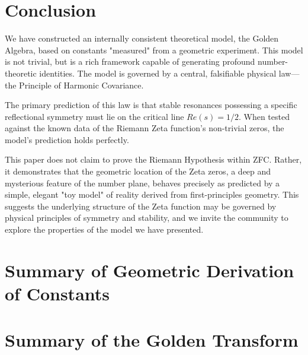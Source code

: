 \documentclass{article}
\theoremstyle{plain}
\theoremstyle{definition}
\theoremstyle{remark}
\begin{document}
\section{Conclusion}
We have constructed an internally consistent theoretical model, the Golden Algebra, based on constants "measured" from a geometric experiment. This model is not trivial, but is a rich framework capable of generating profound number-theoretic identities. The model is governed by a central, falsifiable physical law—the Principle of Harmonic Covariance.

The primary prediction of this law is that stable resonances possessing a specific reflectional symmetry must lie on the critical line $Re(s)=1/2$. When tested against the known data of the Riemann Zeta function's non-trivial zeros, the model's prediction holds perfectly.

This paper does not claim to prove the Riemann Hypothesis within ZFC. Rather, it demonstrates that the geometric location of the Zeta zeros, a deep and mysterious feature of the number plane, behaves precisely as predicted by a simple, elegant "toy model" of reality derived from first-principles geometry. This suggests the underlying structure of the Zeta function may be governed by physical principles of symmetry and stability, and we invite the community to explore the properties of the model we have presented.

\appendix
\section{Summary of Geometric Derivation of Constants}
\section{Summary of the Golden Transform}
\end{document}
